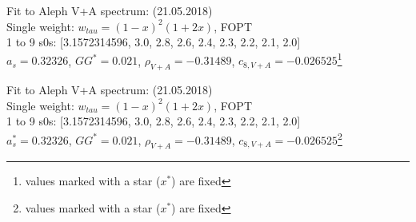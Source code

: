 \documentclass[12pt]{article}
\begin{document}
Fit to Aleph V+A spectrum: (21.05.2018) \\ 
Single weight: $w_{tau} = (1-x)^2 (1+2x)$, FOPT \\
1 to 9 s0s: [3.1572314596, 3.0, 2.8, 2.6, 2.4, 2.3, 2.2, 2.1, 2.0] \\
$a_s=0.32326$, $GG^*=0.021$, $\rho_{V+A}=-0.31489$,
$c_{8,V+A}=-0.026525$\footnote{values marked with a star ($x^*$) are fixed} \\


Fit to Aleph V+A spectrum: (21.05.2018) \\ 
Single weight: $w_{tau} = (1-x)^2 (1+2x)$, FOPT \\
1 to 9 s0s: [3.1572314596, 3.0, 2.8, 2.6, 2.4, 2.3, 2.2, 2.1, 2.0] \\
$a_s^*=0.32326$, $GG^*=0.021$, $\rho_{V+A}=-0.31489$,
$c_{8,V+A}=-0.026525$\footnote{values marked with a star ($x^*$) are fixed} \\
\end{document}
